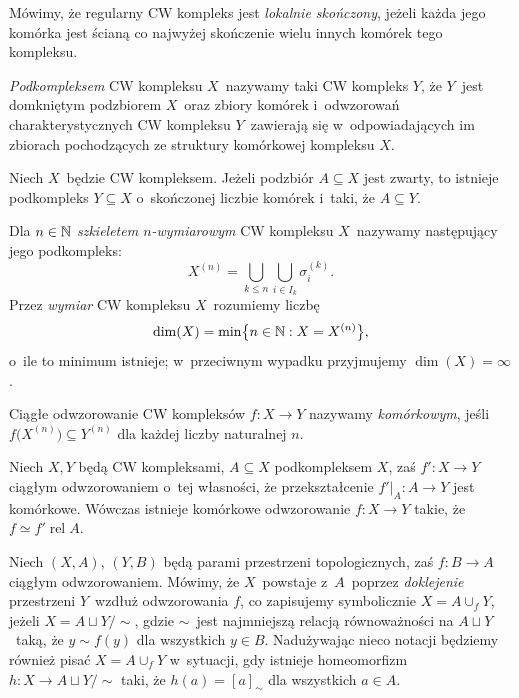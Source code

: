 Mówimy, że regularny CW kompleks jest \textit{lokalnie skończony}, jeżeli każda jego komórka jest ścianą co najwyżej skończenie wielu innych komórek tego kompleksu.

\textit{Podkompleksem} CW kompleksu $X$~nazywamy taki CW kompleks $Y$, że $Y$~jest domkniętym podzbiorem $X$~oraz zbiory komórek i~odwzorowań charakterystycznych CW kompleksu $Y$~zawierają się w~odpowiadających im zbiorach pochodzących ze struktury komórkowej kompleksu $X$.

\begin{lem}\label{lem-cw_zwarty_podzbior_w_skonczonym_podkompleksie}
Niech $X$~będzie CW kompleksem. Jeżeli podzbiór $A\subseteq X$ jest zwarty, to istnieje podkompleks $Y\subseteq X$ o~skończonej liczbie komórek i~taki, że $A\subseteq Y$.
\end{lem}

Dla $n\in \mathbb{N}$ \textit{szkieletem $n$-wymiarowym} CW kompleksu $X$~nazywamy następujący jego podkompleks: \[X^{(n)}=\bigcup_{k\leq n}\bigcup_{i\in I_k}\sigma^{(k)}_i.\]Przez \textit{wymiar} CW kompleksu $X$~rozumiemy liczbę \[\dim(X)=\min\bigl\{n\in\mathbb{N}:X=X^{(n)}\bigr\},\]  o~ile to minimum istnieje; w~przeciwnym wypadku przyjmujemy $\dim(X)=\infty$.

Ciągłe odwzorowanie CW kompleksów $f\colon X\to Y$ nazywamy \textit{komórkowym}, jeśli $f\bigl(X^{(n)}\bigr)\subseteq Y^{(n)}$ dla każdej liczby naturalnej $n$.

\begin{tw}\label{tw-o_aproksymacji_komorkowej}
Niech $X,Y$ będą CW kompleksami, $A\subseteq X$ podkompleksem $X$, zaś $f'\colon X\to Y$ ciągłym odwzorowaniem o~tej własności, że przekształcenie $f'\big |_{A}\colon A\to Y$ jest komórkowe. Wówczas istnieje komórkowe odwzorowanie $f\colon X\to Y$ takie, że $f\simeq f' \operatorname{rel} A$.
\end{tw}

Niech $(X,A)$, $(Y,B)$ będą parami przestrzeni topologicznych, zaś $f\colon B\to A$ ciągłym odwzorowaniem. Mówimy, że $X$~powstaje z~$A$~poprzez \textit{doklejenie} przestrzeni $Y$~wzdłuż odwzorowania $f$, co zapisujemy symbolicznie $X=A\cup_{f} Y$, jeżeli $X=A\sqcup Y\big/\!\sim$, gdzie $\sim$~jest najmniejszą relacją równoważności na $A\sqcup Y$~taką, że $y\sim f(y)$ dla wszystkich $y\in B$. Nadużywając nieco notacji będziemy również pisać $X=A\cup_{f} Y$ w~sytuacji, gdy istnieje homeomorfizm $h\colon X\to A\sqcup Y\big/\!\sim$ taki, że $h(a)=[a]_\sim$ dla wszystkich $a\in A$.


